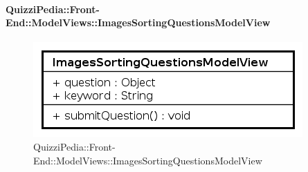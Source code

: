 \paragraph[QuizziPedia::Front-End::ModelViews\\::ImagesSortingQuestionsModelView]{QuizziPedia::Front-End::ModelViews::ImagesSortingQuestionsModelView}
\begin{figure} [ht]
	\centering
	\includegraphics[scale=0.80]{UML/Classi/Front-End/QuizziPedia_Front-end_ModelView_ImagesSortingQuestionsModelView.png}
	\caption{QuizziPedia::Front-End::ModelViews::ImagesSortingQuestionsModelView}
\end{figure} \FloatBarrier
